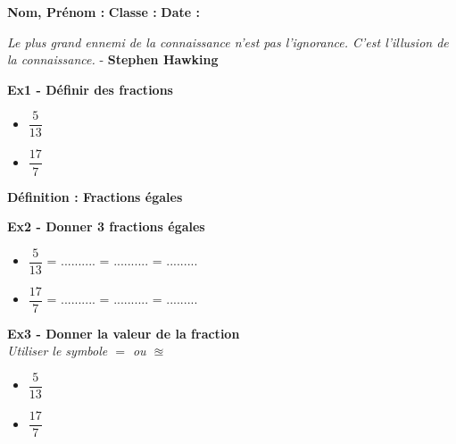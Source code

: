 



\textbf{Nom, Prénom :} \hspace{8cm} \textbf{Classe :} \hspace{3cm} \textbf{Date :}\\

\begin{center}
  \textit{Le plus grand ennemi de la connaissance n'est pas l'ignorance. C'est l'illusion de la connaissance.} - \textbf{Stephen Hawking}
\end{center}

\textbf{Ex1 - Définir des fractions}

\begin{itemize}[label={$\bullet$}]
  \item $\dfrac{5}{13}$ \dotfill
  \item $\dfrac{17}{7}$ \dotfill
\end{itemize}

\textbf{Définition : Fractions égales} \\ \Pointilles[3] 


\textbf{Ex2 - Donner 3 fractions égales}

\begin{itemize}[label={$\bullet$}]
  \item $\dfrac{5}{13}$ = .......... = .......... =  ......... \\
  \item $\dfrac{17}{7}$ = .......... = .......... =  ......... \\
\end{itemize}

\textbf{Ex3 - Donner la valeur de la fraction}\\
\textit{Utiliser le symbole $=$ ou $\approxeq$}

\begin{itemize}[label={$\bullet$}]
  \item $\dfrac{5}{13}$ \dotfill \\
  \item $\dfrac{17}{7}$ \dotfill \\
\end{itemize}

